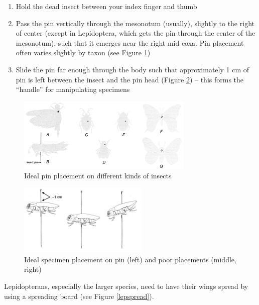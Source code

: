 \documentclass[letterpaper, 11pt]{article}
\begin{document}
\begin{enumerate}
\item Hold the dead insect between your index finger and thumb
\item Pass the pin vertically through the mesonotum (usually), slightly to the right of center (except in Lepidoptera, which gets the pin through the center of the mesonotum), such that it emerges near the right mid coxa.  Pin placement often varies slightly by taxon (see Figure \ref{pinthorax})
\item Slide the pin far enough through the body such that approximately 1 cm of pin is left between the insect and the pin head (Figure \ref{pinplace}) – this forms the ``handle'' for manipulating specimens
\end{enumerate}

\begin{figure}[ht!]
	\centering
  \includegraphics[width=0.75\textwidth]{PinsThorax}
  \caption{Ideal pin placement on different kinds of insects \citep[modified from][Fig. 17]{USDAmanual1986}}
  \label{pinthorax}
\end{figure}

\begin{figure}[ht!]
	\centering
  \includegraphics[width=0.55\textwidth]{PinPlacement}
  \caption{Ideal specimen placement on pin (left) and poor placements (middle, right) \citep[modified from][Fig. 16]{USDAmanual1986}}
  \label{pinplace}
\end{figure}

Lepidopterans, especially the larger species, need to have their wings spread by using a spreading board (see Figure \ref{lepspread}).
\end{document}
